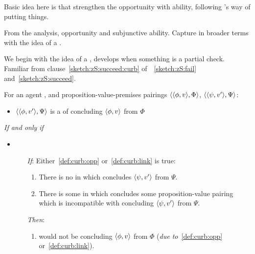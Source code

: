 
\begin{note}
  \color{red}
  Basic idea here is that strengthen the opportunity with ability, following \citeauthor{Austin:1961vz}'s way of putting things.
\end{note}

\begin{note}
  \color{red}
  From the analysis, opportunity and subjunctive ability.
  Capture in broader terms with the idea of a \curb{}.
\end{note}

\begin{note}[\curb{3}]
  We begin with the idea of a \curb{}, develops when something is a partial check.
  Familiar from clause~\autoref{sketch:zS:succeed:curb} of~~\ref{sketch:zS:fail} and~\ref{sketch:zS:succeed}.

  \begin{definition}[A \curb{0}]
    \label{def:curb}
    For an agent \vAgent{}, and proposition-value-premises pairings \(\langle \langle \phi, v \rangle, \Phi \rangle\), \(\langle \langle \psi, v' \rangle, \Psi \rangle\):

    \begin{itemize}
    \item
      \(\langle \langle \phi, v' \rangle, \Psi \rangle\) is a \emph{\curb{}} of concluding \(\langle \phi, v \rangle\) from \(\Phi\)
    \end{itemize}

    \emph{If and only if}

    \begin{itemize}
    \item
        \begin{enumerate}
        \item[\emph{If}:]
          Either~\ref{def:curb:opp} or~\ref{def:curb:link} is true:

          \begin{enumerate}[label=\alph*., ref=(\alph*)]
          \item
            \label{def:curb:opp}
            There is no \pevent{} in which \vAgent{} concludes \(\langle \psi, v' \rangle\) from \(\Psi\).
          \item
            \label{def:curb:link}
            There is some \pevent{} in which \vAgent{} concludes some proposition-value pairing which is incompatible with concluding \(\langle \psi, v' \rangle\) from \(\Psi\).
          \end{enumerate}
        \item[\emph{Then}:]
          \begin{enumerate}[label=\alph*., ref=(\alph*), resume]
          \item
            \label{def:curb:fail}
            \vAgent{} would not be concluding \(\langle \phi, v \rangle\) from \(\Phi\) (\emph{due to}~\ref{def:curb:opp} or~\ref{def:curb:link}).
          \end{enumerate}
      \end{enumerate}
    \end{itemize}
    \vspace{-\baselineskip}
  \end{definition}


\end{note}
